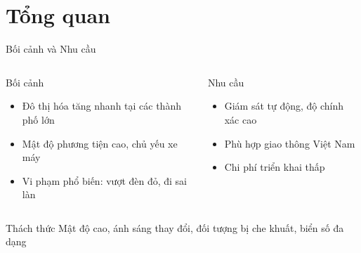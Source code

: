 \section{Tổng quan}

\begin{frame}{Bối cảnh và Nhu cầu}
    \begin{columns}
        \begin{block}{Bối cảnh}
        \begin{itemize}
            \item Đô thị hóa tăng nhanh tại các thành phố lớn
            \item Mật độ phương tiện cao, chủ yếu xe máy
            \item Vi phạm phổ biến: vượt đèn đỏ, đi sai làn
        \end{itemize}
        \end{block}

        \begin{block}{Nhu cầu}
        \begin{itemize}
            \item Giám sát tự động, độ chính xác cao
            \item Phù hợp giao thông Việt Nam
            \item Chi phí triển khai thấp
        \end{itemize}
        \end{block}
    \end{columns}

    \vspace{0.5em}
    \begin{alertblock}{Thách thức}
    Mật độ cao, ánh sáng thay đổi, đối tượng bị che khuất, biển số đa dạng
    \end{alertblock}
\end{frame}

